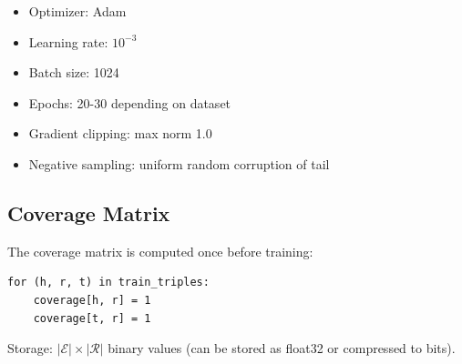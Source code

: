 \begin{itemize}
    \item Optimizer: Adam
    \item Learning rate: $10^{-3}$
    \item Batch size: 1024
    \item Epochs: 20-30 depending on dataset
    \item Gradient clipping: max norm 1.0
    \item Negative sampling: uniform random corruption of tail
\end{itemize}

\subsection{Coverage Matrix}

The coverage matrix is computed once before training:
\begin{verbatim}
for (h, r, t) in train_triples:
    coverage[h, r] = 1
    coverage[t, r] = 1
\end{verbatim}

Storage: $|\mathcal{E}| \times |\mathcal{R}|$ binary values (can be stored as float32 or compressed to bits).
